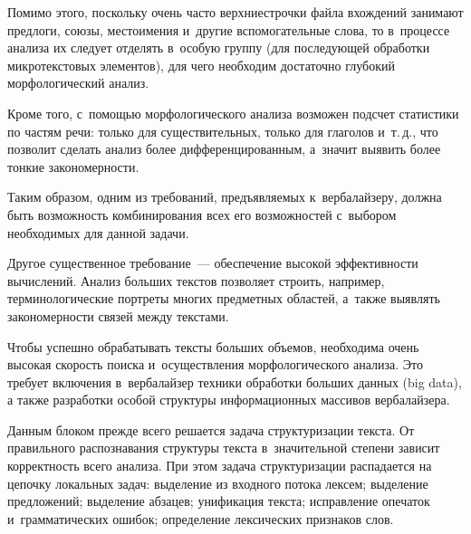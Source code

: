 \begin{multicols}{2}
     Помимо этого, поскольку очень часто верхние\linebreak строчки файла 
вхождений занимают предлоги, союзы, местоимения и~другие 
вспомогательные слова, то в~процессе анализа их следует отделять в~особую 
группу (для последующей обработки \mbox{микротекстовых} элементов), для чего 
необходим достаточно глубокий морфологический анализ. 
     
     Кроме того, с~помощью морфологического анализа возможен подсчет 
статистики по частям речи: только для существительных, только для 
глаголов и~т.\,д., что позволит сделать анализ более дифференцированным, 
а~значит выявить более тонкие закономерности.
     
     Таким образом, одним из требований, предъявляемых к~вербалайзеру, 
должна быть возможность комбинирования всех его возможностей 
с~выбором необходимых для данной задачи.
     
     Другое существенное требование~--- обеспечение высокой 
эффективности вычислений. Анализ больших текстов позволяет строить, 
например, терминологические портреты многих предметных областей, 
а~также выявлять закономерности связей между текстами.
     
     Чтобы успешно обрабатывать тексты больших объемов, необходима 
очень высокая скорость поиска и~осуществления морфологического анализа. 
Это требует включения в~вербалайзер техники обработки больших данных 
(big data), а также разработки особой структуры информационных массивов 
вербалайзера. 
     
     Данным блоком прежде всего решается задача структуризации текста. 
От правильного распознавания структуры текста в~значительной степени 
зависит корректность всего анализа. При этом задача структуризации 
распадается на цепочку локальных задач: выделение из входного потока 
лексем; выделение предложений; выделение абзацев; унификация текста; 
исправление опечаток и~грамматических ошибок; определение лексических 
признаков слов.
     

\end{multicols}

